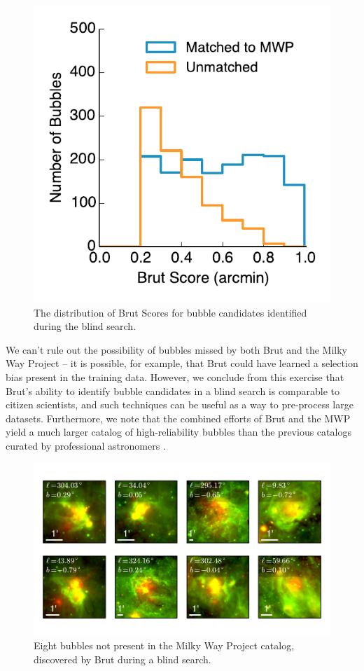 \begin{figure}[h!]
\includegraphics{new_score}
\caption{The distribution of Brut Scores for bubble candidates identified during the blind search.}
\label{fig:new_score}
\end{figure}

We can't rule out the possibility of bubbles missed by both Brut and the Milky Way Project -- it is possible, for example, that Brut could have learned a selection bias present in the training data. However, we conclude from this exercise that Brut's ability to identify bubble candidates in a blind search is comparable to citizen scientists, and such techniques can be useful as a way to pre-process large datasets. Furthermore, we note that the combined efforts of Brut and the MWP yield a much larger catalog of high-reliability bubbles than the previous catalogs curated by professional astronomers \citep{Churchwell06, Churchwell07}.

\begin{figure}
\includegraphics{new_gallery}
\caption{Eight bubbles not present in the Milky Way Project catalog, discovered by Brut during a blind search.}
\label{fig:new_gallery}
\end{figure}

